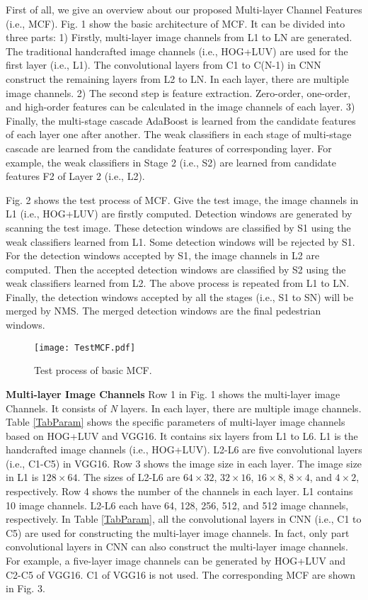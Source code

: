 \documentclass[journal]{IEEEtran}
\begin{document}
First of all, we give an overview about our proposed Multi-layer Channel Features (i.e., MCF). Fig. 1 show the basic architecture of MCF. It can be divided into three parts: 1) Firstly, multi-layer image channels from L1 to LN are generated. The traditional handcrafted image channels (i.e., HOG+LUV) are used for the first layer (i.e., L1). The convolutional layers from C1 to C(N-1) in CNN construct the remaining layers from L2 to LN. In each layer, there are multiple image channels. 2) The second step is feature extraction. Zero-order, one-order, and high-order features can be calculated in the image channels of each layer. 3) Finally, the multi-stage cascade AdaBoost is learned from the candidate features of each layer one after another. The weak classifiers in each stage of multi-stage cascade are learned from the candidate features of corresponding layer. For example, the weak classifiers in Stage 2 (i.e., S2) are learned from candidate features F2 of Layer 2 (i.e., L2).

Fig. 2 shows the test process of MCF. Give the test image, the image channels in L1 (i.e., HOG+LUV) are firstly computed. Detection windows are generated by scanning the test image. These detection windows are classified by S1 using the weak classifiers learned from L1. Some detection windows will be rejected by S1. For the detection windows accepted by S1, the image channels in L2 are computed. Then the accepted detection windows are classified by S2 using the weak classifiers learned from L2. The above process is repeated from L1 to LN. Finally, the detection windows accepted by all the stages (i.e., S1 to SN) will be merged by NMS. The merged detection windows are the final pedestrian windows.

\begin{figure}[!t]
\label{TestMCF}
\centering
\texttt{[image: TestMCF.pdf]}
\caption{Test process of basic MCF.} 
\end{figure}


\textbf{Multi-layer Image Channels} Row 1 in Fig. 1 shows the multi-layer image Channels. It consists of \textit{N} layers. In each layer, there are multiple image channels. Table \ref{TabParam} shows the specific parameters of multi-layer image channels based on HOG+LUV and VGG16. It contains six layers from L1 to L6. L1 is the handcrafted image channels (i.e., HOG+LUV). L2-L6 are five convolutional layers (i.e., C1-C5) in VGG16. Row 3 shows the image size in each layer. The image size in L1 is $128\times64$. The sizes of L2-L6 are $64\times32$, $32\times16$, $16\times8$, $8\times4$, and $4\times2$, respectively. Row 4 shows the number of the channels in each layer. L1 contains 10 image channels. L2-L6 each have 64, 128, 256, 512, and 512 image channels, respectively. In Table \ref{TabParam}, all the convolutional layers in CNN (i.e., C1 to C5) are used for constructing the multi-layer image channels. In fact, only part convolutional layers in CNN can also construct the multi-layer image channels. For example, a five-layer image channels can be generated by HOG+LUV and C2-C5 of VGG16. C1 of VGG16 is not used.  The corresponding MCF are shown in Fig. 3.
\end{document}
